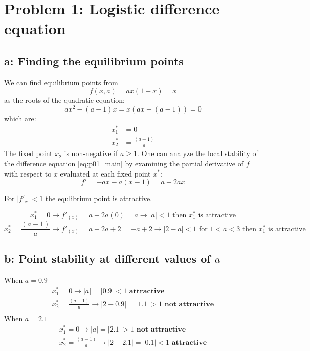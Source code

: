 \newcommand{\package}{\emph}

\setcounter{chapter}{1}
\setcounter{section}{0}
\section{Problem 1: Logistic difference equation}
\subsection{a: Finding the equilibrium points}
We can find equilibrium points from  
\begin{equation}
f(x, a) = ax(1-x) = x
\label{eq:p01_main}
\end{equation}
as the roots of the quadratic equation:
\begin{equation}
ax^2 - (a - 1)x = x(ax - (a - 1)) = 0
\end{equation}
which are:
\begin{align}
x^*_1 &= 0 \\
x^*_2 &= \frac{(a-1)}{a}
\end{align}
The fixed point $x_2$ is non-negative if $a \geq 1$.
One can analyze the local stability of the difference equation \ref{eq:p01_main} by examining the partial derivative of $f$ with respect to $x$ evaluated at each fixed point $x^{\ast}$:
\begin{equation}
f' = - ax - a(x - 1) = a- 2ax
\label{eq:p01_diffmain}
\end{equation}

For $|f'_{x} | < 1$ the equlibrium point is attractive.

\[x^*_1 = 0 \rightarrow f'_{(x)} = a -2a(0) = a \rightarrow |a| < 1 \text{ then } x^*_1 \text{ is attractive}\]
\[x^*_2 = \frac{(a-1)}{a} \rightarrow f'_{(x)} = a -2a +2 = -a+2 \rightarrow |2-a| < 1 \text{ for } 1<a<3 \text{ then }x^*_1 \text{ is attractive}\]

\subsection{b: Point stability at different values of $a$}

When \textbf{$a = 0.9$}
\begin{eqnarray}
x^*_1 = 0 \rightarrow |a| = |0.9| < 1 \textbf{ attractive}\\
x^*_2 = \frac{(a-1)}{a}  \rightarrow |2-0.9|  = |1.1| > 1 \textbf{ not attractive}\\
\end{eqnarray}
When \textbf{$a = 2.1$}
\begin{eqnarray}
x^*_1 = 0 \rightarrow |a| = |2.1| > 1 \textbf{ not attractive}\\
x^*_2 = \frac{(a-1)}{a}  \rightarrow |2-2.1|  = |0.1| < 1 \textbf{ attractive}\\
\end{eqnarray}

